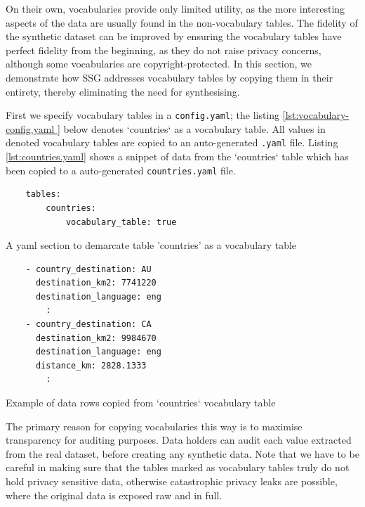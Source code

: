 \documentclass[11pt]{article}
\begin{document}
On their own, vocabularies provide only limited utility, as the more interesting aspects of the data are usually found in the non-vocabulary tables. The fidelity of the synthetic dataset can be improved by ensuring the vocabulary tables have perfect fidelity from the beginning, as they do not raise privacy concerns, although some vocabularies are copyright-protected. In this section, we demonstrate how SSG addresses vocabulary tables by copying them in their entirety, thereby eliminating the need for synthesising.

First we specify vocabulary tables in a \texttt{config.yaml}; the listing \ref{lst:vocabulary-config.yaml } below denotes `countries` as a vocabulary table. All values in denoted vocabulary tables are copied to an auto-generated \texttt{.yaml} file. Listing \ref{lst:countries.yaml} shows a snippet of data from the `countries` table which has been copied to a auto-generated \texttt{countries.yaml} file.

\begin{listing}[H]
\begin{verbatim}
    tables:
        countries:
            vocabulary_table: true
\end{verbatim}
\caption{A yaml section to demarcate table 'countries' as a vocabulary table}
\label{lst:vocabulary-config.yaml }
\end{listing}

\begin{listing}[H]
\begin{verbatim}
    - country_destination: AU
      destination_km2: 7741220
      destination_language: eng
        :
    - country_destination: CA
      destination_km2: 9984670
      destination_language: eng
      distance_km: 2828.1333
        :
\end{verbatim}
\caption{Example of data rows copied from `countries` vocabulary table}
\label{lst:countries.yaml}
\end{listing}

The primary reason for copying vocabularies this way is to maximise transparency for auditing purposes. Data holders can audit each value extracted from the real dataset, before creating any synthetic data. Note that we have to be careful in making sure that the tables marked as vocabulary tables truly do not hold privacy sensitive data, otherwise catastrophic privacy leaks are possible, where the original data is exposed raw and in full. 
\end{document}
